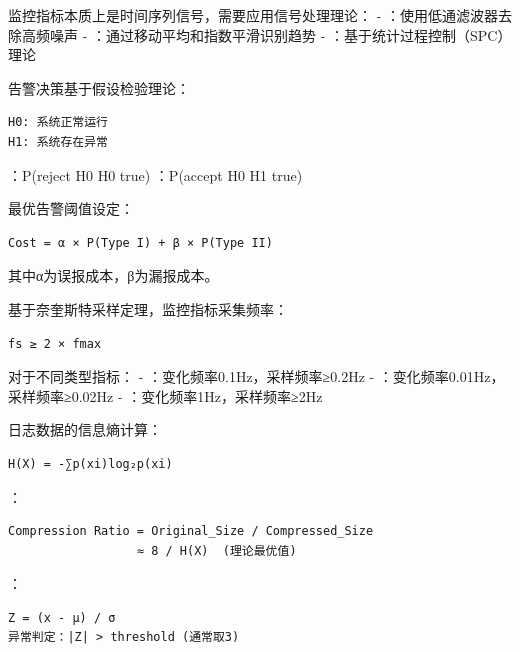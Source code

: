 监控指标本质上是时间序列信号，需要应用信号处理理论： - ：使用低通滤波器去除高频噪声 - ：通过移动平均和指数平滑识别趋势 - ：基于统计过程控制（SPC）理论


告警决策基于假设检验理论：

\begin{lstlisting}
H0: 系统正常运行
H1: 系统存在异常
\end{lstlisting}

：P(reject H0 \textbar{} H0 true) ：P(accept H0 \textbar{} H1 true)

最优告警阈值设定：

\begin{lstlisting}
Cost = α × P(Type I) + β × P(Type II)
\end{lstlisting}

其中α为误报成本，β为漏报成本。


基于奈奎斯特采样定理，监控指标采集频率：

\begin{lstlisting}
fs ≥ 2 × fmax
\end{lstlisting}

对于不同类型指标： - ：变化频率0.1Hz，采样频率≥0.2Hz - ：变化频率0.01Hz，采样频率≥0.02Hz - ：变化频率1Hz，采样频率≥2Hz


日志数据的信息熵计算：

\begin{lstlisting}
H(X) = -∑p(xi)log₂p(xi)
\end{lstlisting}

：

\begin{lstlisting}
Compression Ratio = Original_Size / Compressed_Size
                  ≈ 8 / H(X)  (理论最优值)
\end{lstlisting}


：

\begin{lstlisting}
Z = (x - μ) / σ
异常判定：|Z| > threshold (通常取3)
\end{lstlisting}

